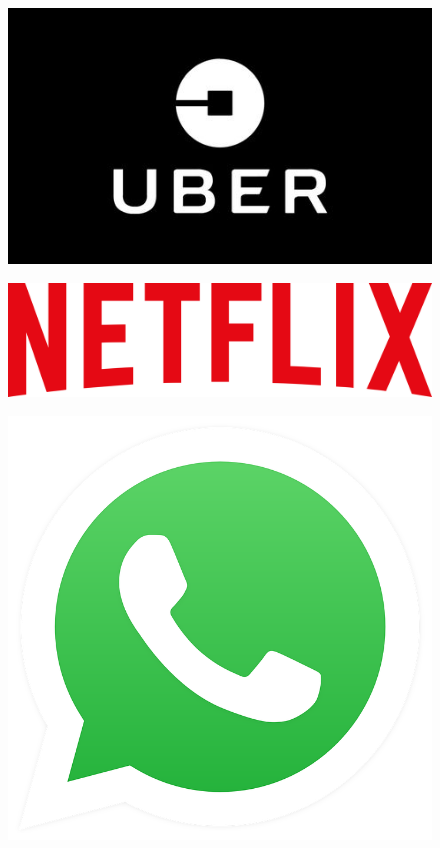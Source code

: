 \begin{frame}{}
	\begin{figure}
        \centering
        \begin{minipage}{.5\textwidth}
          \centering
          \includegraphics[width=.5\linewidth]{img/proj_tcc/uber.jpg}
          \label{figure:facebook}
        \end{minipage}%
        \begin{minipage}{.5\textwidth}
          \centering
          \vspace{15pt}  %
          \includegraphics[width=.7\linewidth]{img/proj_tcc/netflix.png}
          \label{figure:cloudflare}
        \end{minipage}
    \end{figure}	
    \begin{figure}
        \centering
        \begin{minipage}{.5\textwidth}
          \centering
          \includegraphics[width=.5\linewidth]{img/proj_tcc/whatsapp.png}

\end{minipage}
\end{figure}
\end{frame}
